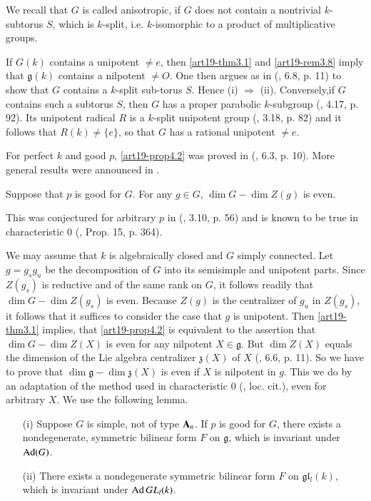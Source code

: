 We recall that $G$ is called anisotropic, if $G$ does not contain a nontrivial $k$-subtorus $S$, which is $k$-split, i.e. $k$-isomorphic to a product of multiplicative groups.

If $G(k)$ contains a unipotent $\neq e$, then \ref{art19-thm3.1} and \ref{art19-rem3.8} imply that $\mathfrak{g}(k)$ contains a nilpotent $\neq O$. One then argues as in (\cite{art19-key10}, 6.8, p. 11) to show that $G$ contains a $k$-split sub-torus $S$. Hence (i) $\Rightarrow$ (ii). Conversely,\pageoriginale if $G$ contains such a subtorus $S$, then $G$ has a proper parabolic $k$-subgroup (\cite{art19-key3}, 4.17, p. 92). Its unipotent radical $R$ is a $k$-split unipotent group (\cite{art19-key3}, 3.18, p. 82) and it follows that $R(k)\neq \{e\}$, so that $G$ has a rational unipotent $\neq e$.

For perfect $k$ and good $p$, \ref{art19-prop4.2} was proved in (\cite{art19-key10}, 6.3, p. 10). More general results were announced in \cite{art19-key17}.

\begin{proposition}\label{art19-prop4.3}
Suppose that $p$ is good for $G$. For any $g\in G$, $\dim G-\dim Z(g)$ is even.
\end{proposition}

This was conjectured for arbitrary $p$ in (\cite{art19-key15}, 3.10, p. 56) and is known to be true in characteristic 0 (\cite{art19-key9}, Prop. 15, p. 364).

We may assume that $k$ is algebraically closed and $G$ simply connected. Let $g=g_{s}g_{u}$ be the decomposition of $G$ into its semisimple and unipotent parts. Since $Z(g_{s})$ is reductive and of the same rank on $G$, it follows readily that $\dim G-\dim Z(g_{s})$ is even. Because $Z(g)$ is the centralizer of $g_{u}$ in $Z(g_{s})$, it follows that it suffices to consider the case that $g$ is unipotent. Then \ref{art19-thm3.1} implies, that \ref{art19-prop4.2} is equivalent to the assertion that $\dim G-\dim Z(X)$ is even for any nilpotent $X\in \mathfrak{g}$. But $\dim Z(X)$ equals the dimension of the Lie algebra centralizer $\mathfrak{z}(X)$ of $X$ (\cite{art19-key10}, 6.6, p. 11). So we have to prove that $\dim \mathfrak{g}-\dim \mathfrak{z}(X)$ is even if $X$ is nilpotent in $g$. This we do by an adaptation of the method used in characteristic 0 (\cite{art19-key9}, loc. cit.), even for arbitrary $X$. We use the following lemma.

\begin{lemma}\label{art19-lem4.4}
\begin{itemize}
\item[\rm(i)] Suppose $G$ is simple, not of type $\mathbf{A}_{n}$. If $p$ is good for $G$, there exists a nondegenerate, symmetric bilinear form $F$ on $\mathfrak{g}$, which is invariant under $\operatorname{\mathrm{Ad}}(G)$.

\item[\rm(ii)] There exists a nondegenerate symmetric bilinear form $F$ on $\mathfrak{g}\mathfrak{l}_{l}(k)$, which is invariant under $\operatorname{\mathrm{Ad}} GL_{l}(k)$.
\end{itemize}
\end{lemma}

